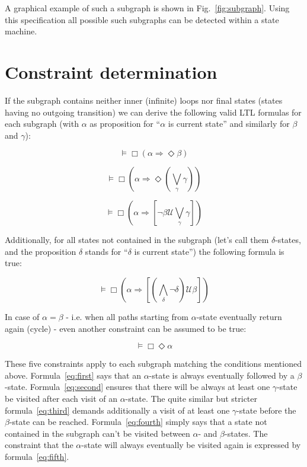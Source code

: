 A graphical example of such a subgraph is shown in Fig.~\ref{fig:subgraph}. Using this specification all possible such subgraphs can be detected within a state machine.



\section{Constraint determination}

If the subgraph contains neither inner (infinite) loops nor final states (states having no outgoing transition) we can derive the following valid LTL formulas for each subgraph (with $\alpha$ as proposition for ``$\alpha$ is current state'' and similarly for $\beta$ and $\gamma$):

\begin{equation} \label{eq:first}
  \models \Box (\alpha \Rightarrow \Diamond \beta)
\end{equation}

\begin{equation} \label{eq:second}
  \models \Box (\alpha \Rightarrow \Diamond (\bigvee_{\gamma} \gamma))
\end{equation}

\begin{equation} \label{eq:third}
  \models \Box (\alpha \Rightarrow [\neg \beta \mathcal{U} \bigvee_{\gamma} \gamma])
\end{equation}

Additionally, for all states not contained in the subgraph (let's call them $\delta$-states, and the proposition $\delta$ stands for ``$\delta$ is current state'') the following formula is true: 

\begin{equation} \label{eq:fourth}
  \models \Box (\alpha \Rightarrow [(\bigwedge_{\delta} \neg \delta) \mathcal{U} \beta])
\end{equation}

In case of $\alpha = \beta$ - i.e. when all paths starting from $\alpha$-state eventually return again (cycle) - even another constraint can be assumed to be true:

\begin{equation} \label{eq:fifth}
  \models \Box \Diamond \alpha
\end{equation}
 

These five constraints apply to each subgraph matching the conditions mentioned above. Formula~\ref{eq:first} says that an $\alpha$-state is always eventually followed by a $\beta$-state. Formula~\ref{eq:second} ensures that there will be always at least one $\gamma$-state be visited after each visit of an $\alpha$-state. The quite similar but stricter formula~\ref{eq:third} demands additionally a visit of at least one $\gamma$-state before the $\beta$-state can be reached. Formula~\ref{eq:fourth} simply says that a state not contained in the subgraph can't be visited between $\alpha$- and $\beta$-states. The constraint that the $\alpha$-state will always eventually be visited again is expressed by formula~\ref{eq:fifth}.

